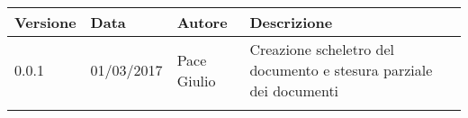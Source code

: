 	\newpage
		\begin{longtabu} to \textwidth {
				X[4,l,p]
				X[4,l,p]
				X[4,l,p]
				X[8,l,p]}
			\toprule
			 Versione & Data & Autore & Descrizione \\
			\midrule
			\endhead
		0.0.1 & 01/03/2017 & Pace Giulio & Creazione scheletro del documento e stesura parziale dei documenti\\
		\addlinespace[0.4em]
		\bottomrule
	\end{longtabu}
